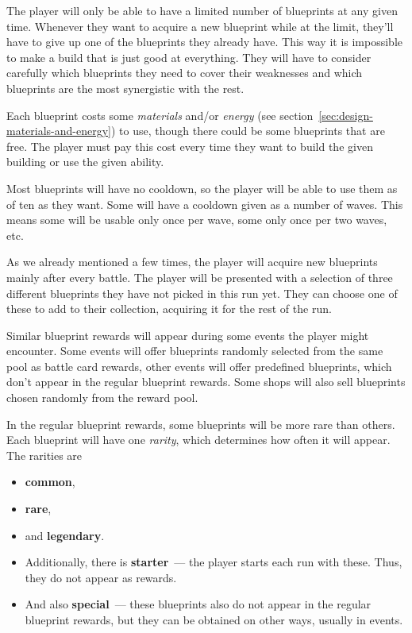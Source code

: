 The player will only be able to have a limited number of blueprints at any given time.
Whenever they want to acquire a new blueprint while at the limit, they'll have to give up one of the blueprints they already have.
This way it is impossible to make a build that is just good at everything.
They will have to consider carefully which blueprints they need to cover their weaknesses and which blueprints are the most synergistic with the rest.

Each blueprint costs some \emph{materials} and/or \emph{energy} (see section~\ref{sec:design-materials-and-energy}) to use, though there could be some blueprints that are free.
The player must pay this cost every time they want to build the given building or use the given ability.

Most blueprints will have no cooldown, so the player will be able to use them as of ten as they want.
Some will have a cooldown given as a number of waves.
This means some will be usable only once per wave, some only once per two waves, etc.

As we already mentioned a few times, the player will acquire new blueprints mainly after every battle.
The player will be presented with a selection of three different blueprints they have not picked in this run yet.
They can choose one of these to add to their collection, acquiring it for the rest of the run.
\begin{notindemo}
    Similar blueprint rewards will appear during some events the player might encounter.
    Some events will offer blueprints randomly selected from the same pool as battle card rewards, other events will offer predefined blueprints, which don't appear in the regular blueprint rewards.
    Some shops will also sell blueprints chosen randomly from the reward pool.
\end{notindemo}

In the regular blueprint rewards, some blueprints will be more rare than others.
Each blueprint will have one \emph{rarity}, which determines how often it will appear.
The rarities are
\begin{itemize}
    \item \textbf{common},
    \item \textbf{rare},
    \item and \textbf{legendary}.
    \item Additionally, there is \textbf{starter}~--- the player starts each run with these. Thus, they do not appear as rewards.
    \item And also \textbf{special}~--- these blueprints also do not appear in the regular blueprint rewards, but they can be obtained on other ways, usually in events.
\end{itemize}

